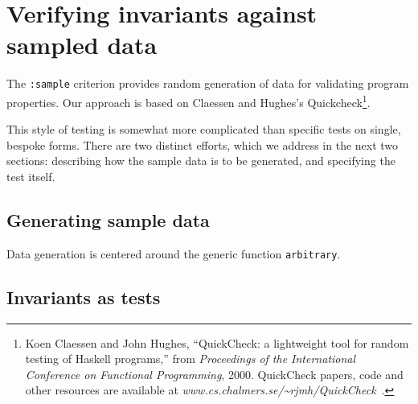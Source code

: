 
\section{Verifying invariants against sampled data}
\label{quickcheck}
The \texttt{:sample} criterion provides random
generation of data for validating program properties.  Our approach is
based on Claessen and Hughes's Quickcheck\footnote{Koen Claessen and
  John Hughes, ``QuickCheck: a lightweight tool for random testing of
  Haskell programs,'' from \emph{Proceedings of the International
    Conference on Functional Programming}, 2000.  QuickCheck papers,
  code and other resources are available at
  \textsl{www.cs.chalmers.se/\~{}rjmh/QuickCheck}~.}.

This style of testing is somewhat more complicated than specific tests
on single, bespoke forms.  There are two distinct efforts, which we
address in the next two sections: describing how the sample data is to
be generated, and specifying the test itself.

\subsection{Generating sample data}
\label{sec:quickcheck-data}
Data generation is centered around the generic function
\texttt{arbitrary}. %




\subsection{Invariants as tests}
\label{sec:quickcheck-tests}


